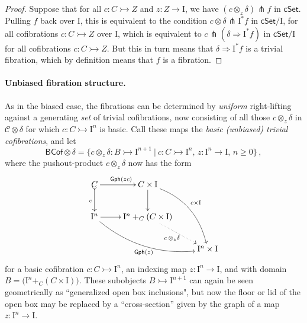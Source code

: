 \documentclass[12pt]{article}
\newcommand{\cSet}{\ensuremath{\mathsf{cSet}}}
\newcommand{\mono}{\ensuremath{\rightarrowtail}}
\newcommand{\ra}{\ensuremath{\rightarrow}}
\newcommand{\I}{\ensuremath{\mathrm{I}}}
\theoremstyle{remark}
\theoremstyle{definition}
\begin{document}
\begin{proof}
Suppose that for all $c : C\mono Z$ and $z:Z\ra\I$, we have $(c\otimes_z\delta) \pitchfork f$ in $\cSet$. Pulling $f$ back over $\I$, this is equivalent to the condition $c\otimes\delta \pitchfork \I^*f$ in $\cSet/\I$, for all cofibrations $c : C\mono Z$ over $\I$, which is equivalent to $c\pitchfork(\delta\Rightarrow \I^*f)$ in $\cSet/\I$ for all cofibrations $c : C\mono Z$.  But this in turn means that $\delta\Rightarrow\I^*f$ is a trivial fibration, which by definition means that $f$ is a fibration.
\end{proof}

\paragraph{Unbiased fibration structure.}\label{sec:unbiasedfibration}

As in the biased case, the fibrations can  be determined by \emph{uniform} right-lifting against a generating \emph{set} of trivial cofibrations, now consisting of all those $c \otimes_z \delta$ in $\mathcal{C}\otimes \delta$ for which $c : C \mono \I^n$ is basic.  Call these maps the \emph{basic (unbiased) trivial cofibrations}, and let 
\begin{equation}\label{eq:basicunbiasedTCof}
\mathsf{BCof}\otimes \delta = \{c \otimes_z \delta : B \mono \I^{n+1}\ |\ c : C\mono \I^n,\, z : \I^n \ra \I,\,n\geq 0\}\,,
\end{equation}
where the pushout-product $c\otimes_z \delta$ now has the form
\begin{equation}\label{diagram:unbiasedbasicpushoutproduct}
\xymatrix{
C \ar@{>->}[d]_{c} \ar[r]^{\mathsf{Gph}(zc)} & C\times \I \ar[d] \ar@/^4ex/ [rdd]^{c\times\I}\\
\I^n \ar@/_4ex/ [rrd]_{\mathsf{Gph}(z)} \ar[r] &  \I^n +_C (C\times\I) \ar@{.>}[rd]_{c\, \otimes_z \delta} \\
&& \I^n\times\I
}
\end{equation}
for a basic cofibration $c : C\mono \I^n$, an indexing map $z : \I^n \ra \I$, and with domain $B = \big(\I^n +_C (C\times\I)\big)$.   These subobjects $B \mono \I^{n+1}$ can again be seen geometrically as ``generalized open box inclusions", but now the floor or lid of the open box may be replaced by a ``cross-section'' given by the graph of a map $z:\I^n\ra \I$.
\end{document}

